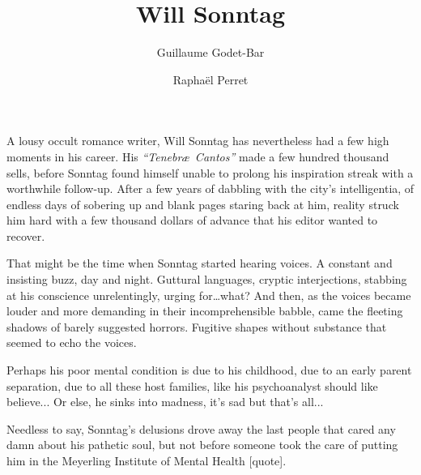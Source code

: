 \documentclass{rpg_player_character}
\title{Will Sonntag}
\begin{document}
\author{Guillaume Godet-Bar \and Rapha\"el Perret}
\maketitle

A lousy occult romance writer, Will Sonntag has nevertheless had a few high
moments in his career. His \emph{``Tenebr\ae\ Cantos''} made a few hundred
thousand sells, before Sonntag found himself unable to prolong his inspiration
streak with a worthwhile follow-up. After a few years of dabbling with the
city's intelligentia, of endless days of sobering up and blank pages staring
back at him, reality struck him hard with a few thousand dollars of advance
that his editor wanted to recover.

That might be the time when Sonntag started hearing voices. A constant and
insisting buzz, day and night. Guttural languages, cryptic interjections,
stabbing at his conscience unrelentingly, urging for\ldots what? And then,
as the voices became louder and more demanding in their incomprehensible
babble, came the fleeting shadows of barely suggested horrors. Fugitive shapes
without substance that seemed to echo the voices.

Perhaps his poor mental condition is due to his childhood, due to an early parent separation, due to all these host families, like his psychoanalyst should like believe... Or else, he sinks into madness, it's sad but that's all...

Needless to say, Sonntag's delusions drove away the last people that cared any
damn about his pathetic soul, but not before someone took the care of putting
him in the Meyerling Institute of Mental Health [quote].
\end{document}
